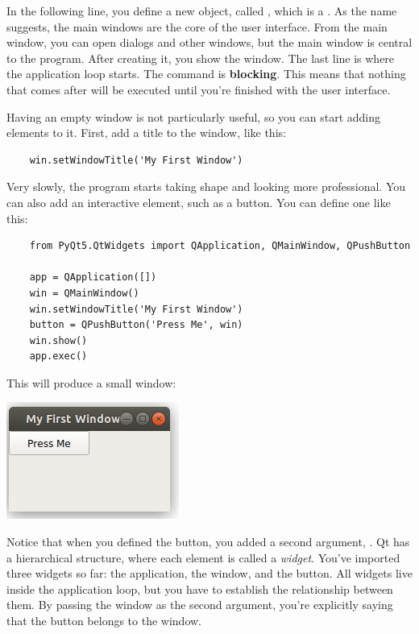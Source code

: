 In the following line, you define a new object, called , which is a . As the name suggests, the main windows are the core of the user interface. From the main window, you can open dialogs and other windows, but the main window is central to the program. After creating it, you show the window. The last line is where the application loop starts. The  command is \textbf{blocking}. This means that nothing that comes after will be executed until you're finished with the user interface.


Having an empty window is not particularly useful, so you can start adding elements to it. First, add a title to the window, like this:

\begin{verbatim}
    win.setWindowTitle('My First Window')
\end{verbatim}

Very slowly, the program starts taking shape and looking more professional. You can also add an interactive element, such as a button. You can define one like this:

\begin{verbatim}
    from PyQt5.QtWidgets import QApplication, QMainWindow, QPushButton

    app = QApplication([])
    win = QMainWindow()
    win.setWindowTitle('My First Window')
    button = QPushButton('Press Me', win)
    win.show()
    app.exec()
\end{verbatim}

This will produce a small window:

\begin{center}
    \includegraphics[width=.3\textwidth]{images/Chapter_08/02_simple_window_and_button.png}
\end{center}

Notice that when you defined the button, you added a second argument, . Qt has a hierarchical structure, where each element is called a \emph{widget}. You've imported three widgets so far: the application, the window, and the button. All widgets live inside the application loop, but you have to establish the relationship between them. By passing the window as the second argument, you're explicitly saying that the button belongs to the window.

